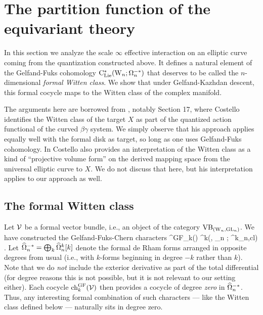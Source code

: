 \section{The partition function of the equivariant theory}

In this section we analyze the scale $\infty$ effective interaction on an elliptic curve coming from the quantization constructed above. 
It defines a natural element of the Gelfand-Fuks cohomology ${\rm C}_{{\rm Lie}}^*({{\rm W}_n} ; \Omega^{-*}_n)$ 
that deserves to be called the $n$-dimensional {\it formal Witten class}. 
We show that under Gelfand-Kazhdan descent, this formal cocycle maps to the Witten class of the complex manifold. 

\begin{rmk}
The arguments here are borrowed from \cite{WG2}, notably Section 17,
where Costello identifies the Witten class of the target $X$ 
as part of the quantized action functional of the curved $\beta\gamma$ system.
We simply observe that his approach applies equally well with the formal disk as target,
so long as one uses Gelfand-Fuks cohomology.
In \cite{WG2} Costello also provides an interpretation of the Witten class as a kind of ``projective volume form''
on the derived mapping space from the universal elliptic curve to $X$.
We do not discuss that here, but his interpretation applies to our approach as well.
\end{rmk}

\subsection{The formal Witten class}

Let $\mathcal{V}$ be a formal vector bundle, i.e., an object of the category ${\rm VB}_{({{\rm W}_n}, {\rm GL}_n)}$. 
We have constructed the Gelfand-Fuks-Chern characters
\ben
\ch^{\rm GF}_k(\cV) \in \clie^k(\Vect, \GL_n ; \hOmega^k_{n,cl}) .
\een
Let $\widehat{\Omega}^{-*}_n = \bigoplus_{k} \widehat{\Omega}^k_n [k]$ denote the formal de Rham forms 
arranged in opposite degrees from usual (i.e., with $k$-forms beginning in degree $-k$ rather than $k$).
Note that we do {\em not} include the exterior derivative as part of the total differential
(for degree reasons this is not possible, but it is not relevant to our setting either).
Each cocycle ${\rm ch}^{\rm GF}_k(\mathcal{V})$ then provides a cocycle of degree \emph{zero} in $\widehat{\Omega}^{-*}_n$.
Thus, any interesting formal combination of such characters --- like the Witten class defined below --- naturally sits in degree zero.

